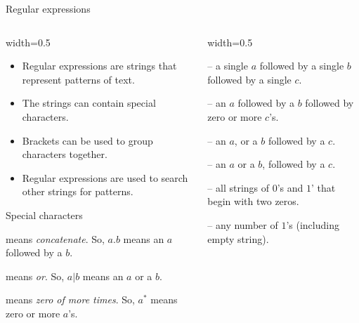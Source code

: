  \begin{frame}[t]{Regular expressions}
  
  \begin{columns}[T]
    \begin{column}{width=0.5\textwidth}
      \begin{itemize}
        \item Regular expressions are strings that represent patterns of text.
        \item The strings can contain special characters.
        \item Brackets can be used to group characters together.
        \item Regular expressions are used to search other strings for patterns.
      \end{itemize}
      \vspace{2mm}
      \begin{alertblock}{Special characters}
        \begin{description}[abbb]
          \item[$.$] means \emph{concatenate}. So, $a.b$ means an $a$ followed by a $b$.
          \item[$|$] means \emph{or}. So, $a|b$ means an $a$ or a $b$.
          \item[$^*$] means \emph{zero of more times}. So, $a^*$ means zero or more $a$'s.
        \end{description}
      \end{alertblock}
    \end{column}
    \begin{column}{width=0.5\textwidth}
      \begin{description}[aaaaaaaa]
        \setlength\itemsep{5mm}
        \item[$a.b.c$] -- a single $a$ followed by a single $b$ followed by a single $c$. 
        \item[$a.b.c^*$] -- an $a$ followed by a $b$ followed by zero or more $c$'s.
        \item[$a|b.c$] -- an $a$, or a $b$ followed by a $c$.
        \item[$(a|b).c$] -- an $a$ or a $b$, followed by a $c$.
        \item[$0.0.(0|1)^*$] -- all strings of $0$'s and $1$' that begin with two zeros.
        \item[$1^*$] -- any number of $1$'s (including empty string).
      \end{description}
    \end{column}
  \end{columns}
\end{frame}


